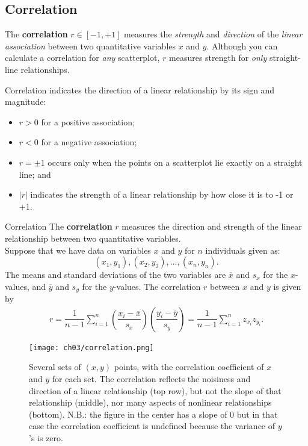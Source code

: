 \subsection{Correlation}

The \textbf{correlation} $r \in [-1, +1]$ measures the \textit{strength} and \textit{direction} of the \textit{linear association} between two quantitative variables $x$ and $y$. Although you can calculate a correlation for \textit{any} scatterplot, $r$ measures strength for \textit{only} straight-line relationships.

Correlation indicates the direction of a linear relationship by its sign and magnitude:

\begin{itemize}[itemsep=0cm]
\item $r > 0$ for a positive association;
\item $r < 0$ for a negative association;
\item $r = \pm 1$ occurs only when the points on a scatterplot lie exactly on a straight line; and
\item $|r|$ indicates the strength of a linear relationship by how close it is to -1 or +1.
\end{itemize}

\begin{definition}{Correlation}{}
    The \textbf{correlation} $r$ measures the direction and strength of the linear relationship between two quantitative variables. \\
    Suppose that we have data on variables $x$ and $y$ for $n$ individuals given as:
    \[
        (x_1, y_1), (x_2, y_2), ..., (x_n, y_n).
    \]
    The means and standard deviations of the two variables are $\bar{x}$ and $s_x$ for the $x$-values, and $\bar{y}$ and $s_y$ for the $y$-values. The correlation $r$ between $x$ and $y$ is given by
    \begin{align*}
        r
        = \dfrac{1}{n-1} \sum_{i=1}^{n}
            \left( \dfrac{x_i - \bar{x}}{s_x} \right)
            \left( \dfrac{y_i - \bar{y}}{s_y} \right)
        = \dfrac{1}{n-1} \sum_{i=1}^{n} z_{x_i} z_{y_i}.
    \end{align*}
\end{definition}

\begin{figure}[ht!]
    \centering
    \texttt{[image: ch03/correlation.png]}
    \caption{Several sets of $(x, y)$ points, with the correlation coefficient of $x$ and $y$ for each set. The correlation reflects the noisiness and direction of a linear relationship (top row), but not the slope of that relationship (middle), nor many aspects of nonlinear relationships (bottom). N.B.: the figure in the center has a slope of 0 but in that case the correlation coefficient is undefined because the variance of $y$'s is zero.}
\end{figure}

